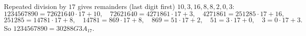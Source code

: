 Repeated division by $17$ gives remainders (last digit first) $10,3,16,8,8,2,0,3$:
\[1234567890=72621640\cdot17+10,\quad 72621640=4271861\cdot17+3,\quad 4271861=251285\cdot17+16,\]
\[251285=14781\cdot17+8,\quad 14781=869\cdot17+8,\quad 869=51\cdot17+2,\quad 51=3\cdot17+0,\quad 3=0\cdot17+3.\]
So $1234567890=\boxed{30288G3A_{17}}$.
